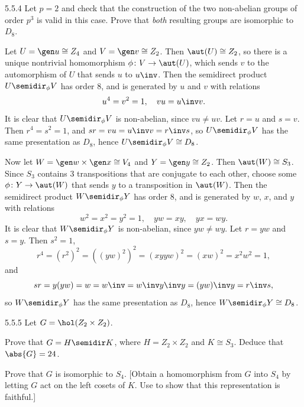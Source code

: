 \begin{exercise}{5.5.4}
    Let $p = 2$ and check that the construction of the two non-abelian groups of order $p^3$ is valid in this case.
	Prove that \emph{both} resulting groups are isomorphic to $D_8$.
\end{exercise}

\begin{sol}
    Let $U = \gen u \cong Z_4$ and $V = \gen v \cong Z_2$.
	Then $\aut(U) \cong Z_2$, so there is a unique nontrivial homomorphism $\phi \colon V \to \aut(U)$, which sends $v$ to the automorphism of $U$ that sends $u$ to $u\inv$.
	Then the semidirect product $U \semidir_\phi V$ has order 8, and is generated by $u$ and $v$ with relations
    \[
    	u^4 = v^2 = 1, \quad vu = u\inv v.
    \]
    It is clear that $U \semidir_\phi V$ is non-abelian, since $vu \neq uv$.
	Let $r = u$ and $s = v$.
	Then $r^4 = s^2 = 1$, and $sr = vu = u\inv v = r\inv s$, so $U \semidir_\phi V$ has the same presentation as $D_8$, hence $U \semidir_\phi V \cong D_8$.

    Now let $W = \gen w \times \gen x \cong V_4$ and $Y = \gen y \cong Z_2$.
	Then $\aut(W) \cong S_3$.
	Since $S_3$ contains 3 transpositions that are conjugate to each other, choose some $\phi \colon Y \to \aut(W)$ that sends $y$ to a transposition in $\aut(W)$.
	Then the semidirect product $W \semidir_\phi Y$ has order 8, and is generated by $w$, $x$, and $y$ with relations
    \[
    	w^2 = x^2 = y^2 = 1, \quad yw = x y, \quad yx = w y.
    \]
    It is clear that $W \semidir_\phi Y$ is non-abelian, since $yw \neq wy$.
	Let $r = yw$ and $s = y$.
	Then $s^2 = 1$,
    \[
    	r^4 = (r^2)^2 = ((yw)^2)^2 = (xyyw)^2 = (xw)^2 = x^2w^2 = 1,
    \]
    and
    \[
    	sr = y(yw) = w = w\inv = w\inv y\inv y = (yw)\inv y = r\inv s,
    \]
    so $W \semidir_\phi Y$ has the same presentation as $D_8$, hence $W \semidir_\phi Y \cong D_8$.
\end{sol}

\begin{exercise}{5.5.5}
    Let $G = \hol(Z_2 \times Z_2)$.
    \begin{subexercises}
        \item Prove that $G = H \semidir K$, where $H = Z_2 \times Z_2$ and $K \cong S_3$.
	    Deduce that $\abs{G} = 24$.
        \item Prove that $G$ is isomorphic to $S_4$. [Obtain a homomorphism from $G$ into $S_4$ by letting $G$ act on the left cosets of $K$.
	    Use  to show that this representation is faithful.]
    \end{subexercises}
\end{exercise}

